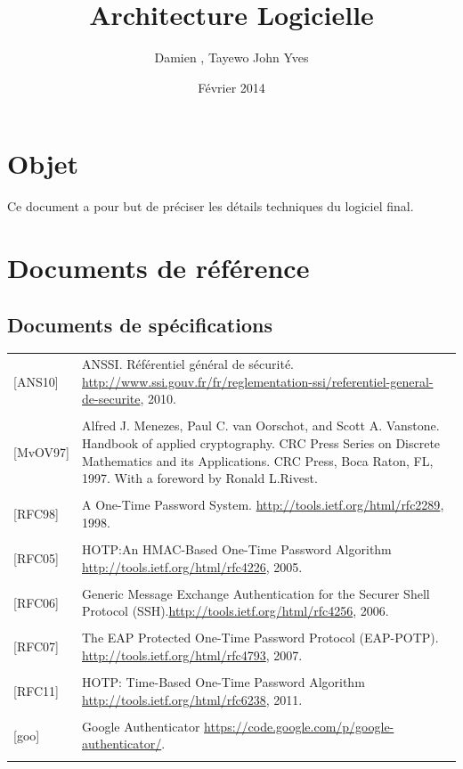 \documentclass{"../../res/univ-projet"}
\title{Architecture Logicielle}
\author{Damien \bsc{Picard}, Tayewo John Yves \bsc{Adegoloye}}
\date{Février 2014}
\begin{document}
\maketitle
\section{Objet}
Ce document a pour but de préciser les détails techniques du logiciel final.

\section{Documents de référence}
\subsection{Documents de spécifications}
\begin{tabular}{p{}>{\raggedright\arraybackslash}p{13cm}}
    {[ANS10]} & {ANSSI. Référentiel général de sécurité. \href{http://www.ssi.gouv.fr/fr/reglementation-ssi/referentiel-general-de-securite}{http://www.ssi.gouv.fr/fr/reglementation-ssi/referentiel-general-de-securite}, 2010.}
    \tabularnewline
    \\
    {[MvOV97]} & {Alfred J. Menezes, Paul C. van Oorschot, and Scott A. Vanstone. Handbook of applied cryptography. CRC Press Series on Discrete Mathematics and its Applications. CRC Press, Boca Raton, FL, 1997. With a foreword by Ronald L.Rivest.}
    \tabularnewline
    \\
    {[RFC98]} & {A One-Time Password System. \href{http://tools.ietf.org/html/rfc2289}{http://tools.ietf.org/html/rfc2289}, 1998.}
    \tabularnewline
    \\
    {[RFC05]} & {HOTP:An HMAC-Based One-Time Password Algorithm \href{http://tools.ietf.org/html/rfc4226}{http://tools.ietf.org/html/rfc4226}, 2005.}
    \tabularnewline
    \\
    {[RFC06]} & {Generic Message Exchange Authentication for the Securer Shell Protocol (SSH).\href{http://tools.ietf.org/html/rfc4256}{http://tools.ietf.org/html/rfc4256}, 2006.}
    \tabularnewline
    \\
    {[RFC07]} & {The EAP Protected One-Time Password Protocol (EAP-POTP). \href{http://tools.ietf.org/html/rfc4793}{http://tools.ietf.org/html/rfc4793}, 2007.}
    \tabularnewline
    \\
    {[RFC11]} & {HOTP: Time-Based One-Time Password Algorithm \href{http://tools.ietf.org/html/rfc6238}{http://tools.ietf.org/html/rfc6238}, 2011.}
    \tabularnewline
    \\
    {[goo]} & {Google Authenticator \href{https://code.google.com/p/google-authenticator/}{https://code.google.com/p/google-authenticator/}.}
    \tabularnewline
    \\
\end{tabular}
\end{document}
